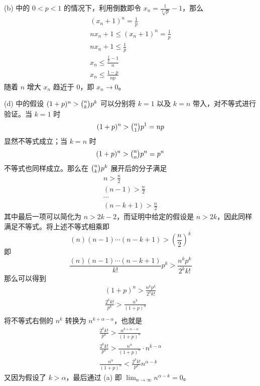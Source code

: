\documentclass[../poma-notes.tex]{subfiles}
\begin{document}
\begin{anote}\mbox{}\par
  (b) 中的 $0 < p < 1$ 的情况下，利用倒数即令 $x_n = \frac{1}{\sqrt[n]{p}} - 1$，那么
  \begin{gather*}
    (x_n + 1)^n = \frac{1}{p}              \\
    nx_n + 1 \le (x_n + 1)^n = \frac{1}{p} \\
    nx_n + 1 \le \frac{1}{p}               \\
    x_n \le \frac{\frac{1}{p} - 1}{n}      \\
    x_n \le \frac{1-p}{np}
  \end{gather*}
  随着 $n$ 增大 $x_n$ 趋近于 $0$，即 $x_n \to 0$。

  (d) 中的假设 $(1 + p)^n > \tbinom{n}{k} p^k$ 可以分别将 $k=1$ 以及 $k=n$ 带入，对不等式进行验证。当 $k=1$ 时
  \[ (1 + p)^n > \tbinom{n}{1} p^1 = np \]
  显然不等式成立；当 $k=n$ 时
  \[ (1 + p)^n > \tbinom{n}{n} p^n = p^n \]
  不等式也同样成立。那么在 $\tbinom{n}{k} p^k$ 展开后的分子满足
  \begin{gather*}
    n > \frac{n}{2} \\
    (n-1) > \frac{n}{2} \\
    \cdots \\
    (n-k+1) > \frac{n}{2}
  \end{gather*}
  其中最后一项可以简化为 $n > 2k - 2$，而证明中给定的假设是 $n > 2k$，因此同样满足不等式。将上述不等式相乘即
  \[ (n)(n-1)\cdots(n-k+1) > (\frac{n}{2})^k \]
  即
  \[ \frac{(n)(n-1)\cdots(n-k+1)}{k!} p^k > \frac{n^kp^k}{2^kk!} \]
  那么可以得到
  \begin{gather*}
    (1+p)^n > \frac{n^kp^k}{2^kk!} \\
    \frac{2^kk!}{p^k} > \frac{n^k}{(1+p)^n} \\
  \end{gather*}
  将不等式右侧的 $n^k$ 转换为 $n^{k + \alpha - \alpha}$，也就是
  \begin{gather*}
    \frac{2^kk!}{p^k} > \frac{n^{k + \alpha - \alpha}}{(1+p)^n} \\
    \frac{2^kk!}{p^k} > \frac{n^{\alpha}}{(1+p)^n} \cdot n^{k - \alpha} \\
    \frac{n^{\alpha}}{(1+p)^n} < \frac{2^kk!}{p^k} n^{\alpha-k}
  \end{gather*}
  又因为假设了 $k > \alpha$，最后通过 (a) 即 $\lim_{n \to \infty} n^{\alpha - k} = 0$。
\end{anote}
\end{document}
